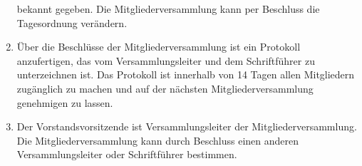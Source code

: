 ﻿\documentclass[10pt,a4paper]{scrartcl}
\begin{document}
\begin{enumerate}
                bekannt gegeben. Die Mitgliederversammlung kann per Beschluss die Tagesordnung
                ver\-ändern.
        \item Über die Beschlüsse der Mitgliederversammlung ist ein Protokoll anzufertigen,
                das vom Versammlungsleiter und dem Schriftführer zu unterzeichnen ist.
                Das Protokoll ist innerhalb von 14 Tagen allen Mitgliedern zugänglich zu
                machen und auf der nächsten Mitgliederversammlung genehmigen zu lassen.
        \item Der Vorstandsvorsitzende ist Versammlungsleiter der Mitgliederversammlung.
                Die Mitgliederversammlung kann durch Beschluss einen anderen Versammlungsleiter
                oder Schrift\-füh\-rer bestimmen.
\end{enumerate}
%
%
\end{document}
